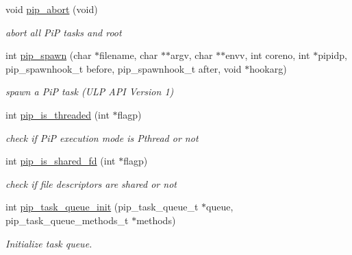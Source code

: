 \begin{DoxyCompactItemize}
\item 
void \hyperlink{group__libpip_ga49a4a9ee014ffdaf0c26df18adf965ad}{pip\-\_\-abort} (void)
\begin{DoxyCompactList}\small\item\em abort all Pi\-P tasks and root \end{DoxyCompactList}\end{DoxyCompactItemize}
\begin{DoxyCompactItemize}
\item 
int \hyperlink{group__libpip_gae9187ea22ecf0623fa3ecfba5337f52d}{pip\-\_\-spawn} (char $\ast$filename, char $\ast$$\ast$argv, char $\ast$$\ast$envv, int coreno, int $\ast$pipidp, pip\-\_\-spawnhook\-\_\-t before, pip\-\_\-spawnhook\-\_\-t after, void $\ast$hookarg)
\begin{DoxyCompactList}\small\item\em spawn a Pi\-P task (U\-L\-P A\-P\-I Version 1) \end{DoxyCompactList}\end{DoxyCompactItemize}
\begin{DoxyCompactItemize}
\item 
int \hyperlink{group__libpip_ga0455093d5040ae45585cc88a5f3f002b}{pip\-\_\-is\-\_\-threaded} (int $\ast$flagp)
\begin{DoxyCompactList}\small\item\em check if Pi\-P execution mode is Pthread or not \end{DoxyCompactList}\end{DoxyCompactItemize}
\begin{DoxyCompactItemize}
\item 
int \hyperlink{group__libpip_ga180ece8f3f537d84db8e70921f3ae099}{pip\-\_\-is\-\_\-shared\-\_\-fd} (int $\ast$flagp)
\begin{DoxyCompactList}\small\item\em check if file descriptors are shared or not \end{DoxyCompactList}\end{DoxyCompactItemize}
\begin{DoxyCompactItemize}
\item 
int \hyperlink{group__libpip_ga9c50d9b2b810d97a75a5fe9c332902e0}{pip\-\_\-task\-\_\-queue\-\_\-init} (pip\-\_\-task\-\_\-queue\-\_\-t $\ast$queue, pip\-\_\-task\-\_\-queue\-\_\-methods\-\_\-t $\ast$methods)
\begin{DoxyCompactList}\small\item\em Initialize task queue. \end{DoxyCompactList}\end{DoxyCompactItemize}

